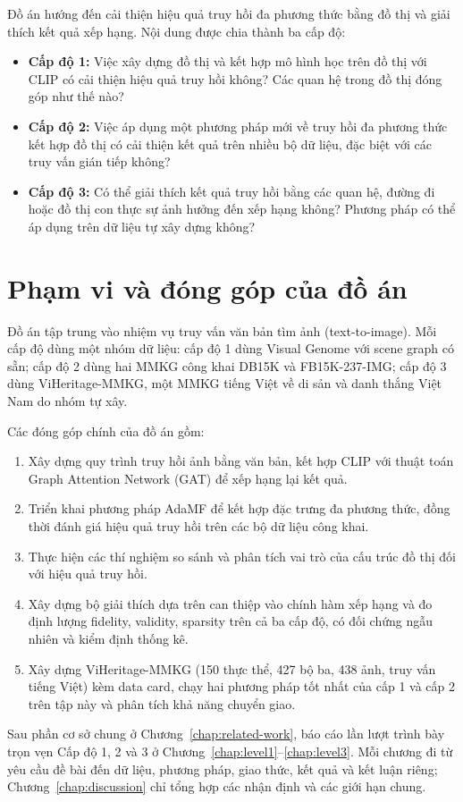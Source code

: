 Đồ án hướng đến cải thiện hiệu quả truy hồi đa phương thức bằng đồ thị và giải thích kết quả xếp hạng. Nội dung được chia thành ba cấp độ:

\begin{itemize}
    \item \textbf{Cấp độ 1:} Việc xây dựng đồ thị và kết hợp mô hình học trên đồ thị với CLIP có cải thiện hiệu quả truy hồi không? Các quan hệ trong đồ thị đóng góp như thế nào?

    \item \textbf{Cấp độ 2:} Việc áp dụng một phương pháp mới về truy hồi đa phương thức kết hợp đồ thị có cải thiện kết quả trên nhiều bộ dữ liệu, đặc biệt với các truy vấn gián tiếp không?

    \item \textbf{Cấp độ 3:} Có thể giải thích kết quả truy hồi bằng các quan hệ, đường đi hoặc đồ thị con thực sự ảnh hưởng đến xếp hạng không? Phương pháp có thể áp dụng trên dữ liệu tự xây dựng không?
\end{itemize}

\section{Phạm vi và đóng góp của đồ án}
\label{sec:research-scope}

Đồ án tập trung vào nhiệm vụ truy vấn văn bản tìm ảnh (text-to-image). Mỗi cấp độ dùng một nhóm dữ liệu: cấp độ 1 dùng Visual Genome với scene graph có sẵn; cấp độ 2 dùng hai MMKG công khai DB15K và FB15K-237-IMG; cấp độ 3 dùng ViHeritage-MMKG, một MMKG tiếng Việt về di sản và danh thắng Việt Nam do nhóm tự xây.

Các đóng góp chính của đồ án gồm:
\begin{enumerate}
    \item Xây dựng quy trình truy hồi ảnh bằng văn bản, kết hợp CLIP với thuật toán Graph Attention Network (GAT) để xếp hạng lại kết quả.

    \item Triển khai phương pháp AdaMF để kết hợp đặc trưng đa phương thức, đồng thời đánh giá hiệu quả truy hồi trên các bộ dữ liệu công khai.

    \item Thực hiện các thí nghiệm so sánh và phân tích vai trò của cấu trúc đồ thị đối với hiệu quả truy hồi.

    \item Xây dựng bộ giải thích dựa trên can thiệp vào chính hàm xếp hạng và đo định lượng fidelity, validity, sparsity trên cả ba cấp độ, có đối chứng ngẫu nhiên và kiểm định thống kê.

    \item Xây dựng ViHeritage-MMKG (150 thực thể, 427 bộ ba, 438 ảnh, truy vấn tiếng Việt) kèm data card, chạy hai phương pháp tốt nhất của cấp 1 và cấp 2 trên tập này và phân tích khả năng chuyển giao.
\end{enumerate}

Sau phần cơ sở chung ở Chương~\ref{chap:related-work}, báo cáo lần lượt trình bày trọn vẹn Cấp độ 1, 2 và 3 ở Chương~\ref{chap:level1}--\ref{chap:level3}. Mỗi chương đi từ yêu cầu đề bài đến dữ liệu, phương pháp, giao thức, kết quả và kết luận riêng; Chương~\ref{chap:discussion} chỉ tổng hợp các nhận định và các giới hạn chung.
